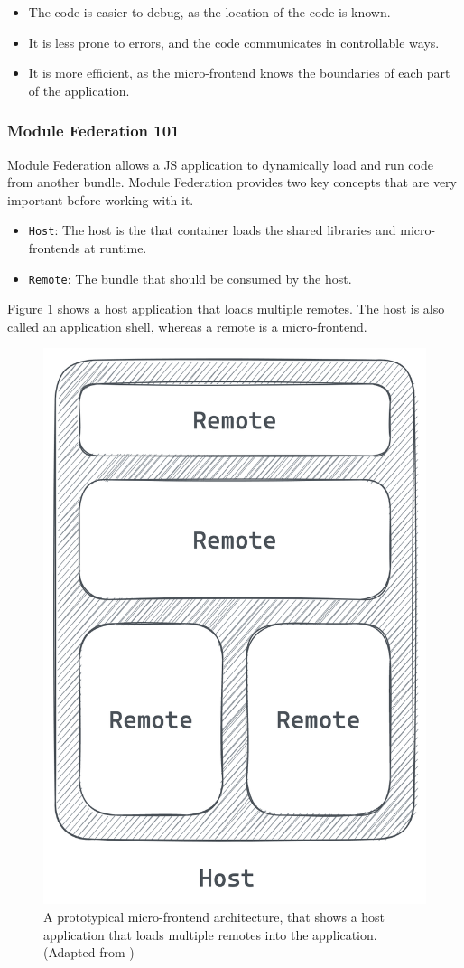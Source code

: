 \begin{itemize}
  \item The code is easier to debug, as the location of the code is known.
  \item It is less prone to errors, and the code communicates in controllable ways.
  \item It is more efficient, as the micro-frontend knows the boundaries of each part of the application.
\end{itemize}

\subsubsection{Module Federation 101}\label{subsubsection:background:micro-frontend:module-federation:101}

Module Federation allows a \ac{JS} application to dynamically load and run code from another bundle. Module Federation provides two key concepts that are very important before working with it. \cite[118-119]{book:2021:mezzalira:applied-methods:building-micro-frontends}

\begin{itemize}
    \item \texttt{Host}: The host is the that container loads the shared libraries and micro-frontends at runtime.
    \item \texttt{Remote}: The bundle that should be consumed by the host.
\end{itemize}

\noindent Figure \ref{fig:background:micro-frontend:module-federation:module-federation-architecture} shows a host application that loads multiple remotes. The host is also called an application shell, whereas a remote is a micro-frontend.

\ifshowImages
\begin{figure}[H]
    \centering
    \includegraphics[width=0.3\linewidth]{images/background/micro-frontends/module-federation/module-federation-architecture.png}
    \caption{A prototypical micro-frontend architecture, that shows a host application that loads multiple remotes into the application. (Adapted from \cite[119]{book:2021:mezzalira:applied-methods:building-micro-frontends})
    }\label{fig:background:micro-frontend:module-federation:module-federation-architecture}
\end{figure}
\fi

